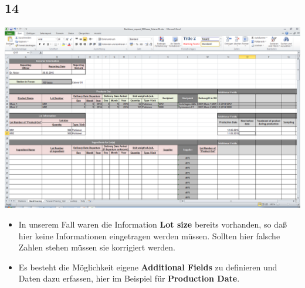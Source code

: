 \documentclass{beamer}
\begin{document}
\subsection{14}
\begin{frame}
	\begin{center}
  		\includegraphics[height=0.6\textheight]{14.png}
	\end{center}
	\begin{itemize}
		\item In unserem Fall waren die Information \textbf{Lot size} bereits vorhanden, so daß hier keine Informationen eingetragen werden müssen. Sollten hier falsche Zahlen stehen müssen sie korrigiert werden.
		\item Es besteht die Möglichkeit eigene \textbf{Additional Fields} zu definieren und Daten dazu erfassen, hier im Beispiel für \textbf{Production Date}.
	\end{itemize}
\end{frame}
\end{document}
